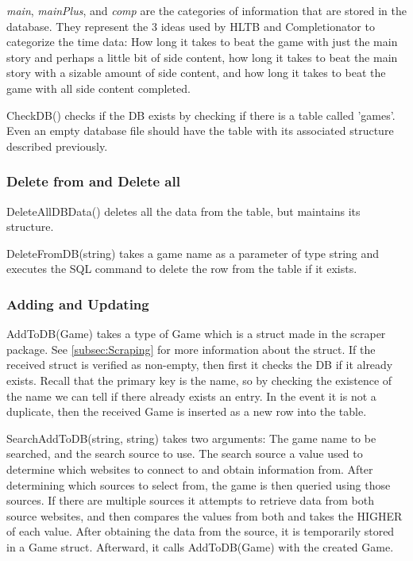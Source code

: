 \textit{main}, \textit{mainPlus}, and \textit{comp} are the
categories of information that are stored in the database. They
represent the 3 ideas used by HLTB and Completionator to categorize
the time data:
How long it takes to beat the game with just the main story and
perhaps a little bit of side content, how long it takes to beat the
main story with a sizable amount of side content, and how long
it takes to beat the game with all side content completed.

CheckDB() checks if the DB exists by checking if there is a table
called 'games'. Even an empty database file should have the table
with its associated structure described previously.

\subsubsection{Delete from and Delete all}

DeleteAllDBData() deletes all the data from the table, but maintains
its structure.

DeleteFromDB(string) takes a game name as a parameter of type string
and executes the SQL command to delete the row from the table if it exists.

\subsubsection{Adding and Updating}

AddToDB(Game) takes a type of Game which is a struct made in the
scraper package. See \ref{subsec:Scraping} for more information
about the struct. If the received struct is verified as non-empty,
then first it checks the DB if it already exists. Recall that the
primary key is the name, so by checking the existence of the name we
can tell if there already exists an entry.
In the event it is not a duplicate, then the received Game is
inserted as a new row into the table.

SearchAddToDB(string, string) takes two arguments: The game name to
be searched, and the search source to use. The search source a value
used to determine which websites to connect to and obtain information from.
After determining which sources to select from, the game is then
queried using those sources. If there are multiple sources it
attempts to retrieve data from both source websites, and then
compares the values from both and takes the HIGHER of each value.
After obtaining the data from the source, it is temporarily stored in
a Game struct. Afterward, it calls AddToDB(Game) with the created Game.

